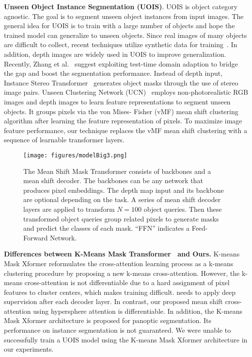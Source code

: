 \documentclass[letterpaper, 10 pt, conference]{ieeeconf}
\begin{document}
\textbf{Unseen Object Instance Segmentation (UOIS)}. UOIS is object category agnostic. The goal is to segment unseen object instances from input images. The general idea for UOIS is to train with a large number of objects and hope the trained model can generalize to unseen objects. Since real images of many objects are difficult to collect, recent techniques utilize synthetic data for training~\cite{shao2018clusternet, xie2020best, danielczuk2019segmenting}. In addition, depth images are widely used in UOIS to improve generalization. Recently, Zhang et al.~\cite{zhang2022unseen} suggest exploiting test-time domain adaption to bridge the gap and boost the segmentation performance. Instead of depth input, Instance Stereo Transformer~\cite{durner2021unknown} generates object masks through the use of stereo image pairs. Unseen Clustering Network (UCN)~\cite{xiang2020learning} employs non-photorealistic RGB images and depth images to learn feature representations to segment unseen objects. It groups pixels via the von Mises-
Fisher (vMF) mean shift clustering algorithm after learning the feature representation of pixels. To maximize image feature performance, our technique replaces the vMF mean shift clustering with a sequence of learnable transformer layers. 

\begin{figure*}
    \vspace{-6mm}
    \centering
\texttt{[image: figures/modelBig3.png]}
    \vspace{-4mm}
    \caption{The Mean Shift Mask Transformer consists of backbones and a mean shift decoder. The backbones can be any network that produces pixel embeddings. The depth map input and its backbone are optional depending on the task. A series of mean shift decoder layers are applied to transform $N=100$ object queries. Then these transformed object queries group related pixels to generate masks and predict the classes of each mask. ``FFN'' indicates a Feed-Forward Network. }
    \label{fig:model}
    \vspace{-6mm}
\end{figure*}

\textbf{Differences between K-Means Mask Transformer~\cite{yu2022k} and Ours.}  K-means Mask Xformer \cite{yu2022k} reformulates the cross-attention learning process as a k-means clustering procedure by proposing a new k-means cross-attention. However, the k-means cross-attention is not differentiable due to a hard assignment of pixel features to cluster centers, which makes training difficult. \cite{yu2022k} needs to apply deep supervision after each decoder layer. In contrast, our proposed mean shift cross-attention using hypersphere attention is differentiable. In addition, the K-means Mask Xformer architecture is proposed for panoptic segmentation. Its performance on instance segmentation is not guaranteed. We were unable to successfully train a UOIS model using the K-means Mask Xformer architecture in our experiments.
\end{document}

